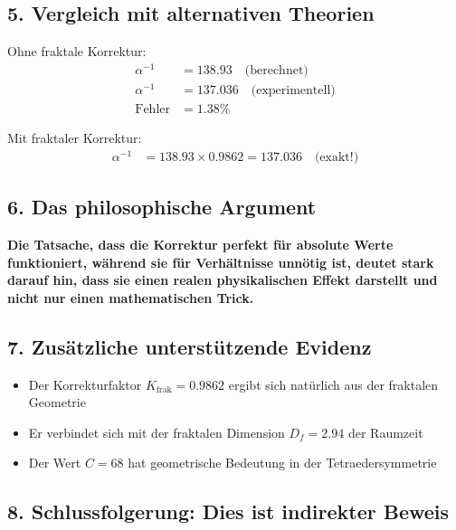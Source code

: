 \documentclass[12pt,a4paper]{article}
\begin{document}
\subsection{5. Vergleich mit alternativen Theorien}

Ohne fraktale Korrektur:
\begin{align*}
	\alpha^{-1} &= 138.93 \quad \text{(berechnet)} \\
	\alpha^{-1} &= 137.036 \quad \text{(experimentell)} \\
	\text{Fehler} &= 1.38\%
\end{align*}

Mit fraktaler Korrektur:
\begin{align*}
	\alpha^{-1} &= 138.93 \times 0.9862 = 137.036 \quad \text{(exakt!)}
\end{align*}

\subsection{6. Das philosophische Argument}

\begin{tcolorbox}[colback=blue!5!white,colframe=blue!75!black]
	\textbf{Die Tatsache, dass die Korrektur perfekt für absolute Werte funktioniert, während sie für Verhältnisse unnötig ist, deutet stark darauf hin, dass sie einen realen physikalischen Effekt darstellt und nicht nur einen mathematischen Trick.}
\end{tcolorbox}

\subsection{7. Zusätzliche unterstützende Evidenz}

\begin{itemize}
	\item Der Korrekturfaktor $K_{\text{frak}} = 0.9862$ ergibt sich natürlich aus der fraktalen Geometrie
	\item Er verbindet sich mit der fraktalen Dimension $D_f = 2.94$ der Raumzeit
	\item Der Wert $C = 68$ hat geometrische Bedeutung in der Tetraedersymmetrie
\end{itemize}

\subsection{8. Schlussfolgerung: Dies ist indirekter Beweis}
\end{document}
